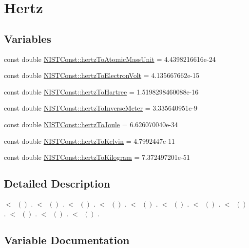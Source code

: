\hypertarget{group___hertz}{}\section{Hertz}
\label{group___hertz}
\subsection*{Variables}
\begin{DoxyCompactItemize}
\item 
const double \hyperlink{group___hertz_ga5e2fd7ea13ae13a34435ff0578082d34}{N\+I\+S\+T\+Const\+::hertz\+To\+Atomic\+Mass\+Unit} = 4.\+4398216616e-\/24
\item 
const double \hyperlink{group___hertz_ga035f43de5d8ad8208675c53a0057d14d}{N\+I\+S\+T\+Const\+::hertz\+To\+Electron\+Volt} = 4.\+135667662e-\/15
\item 
const double \hyperlink{group___hertz_ga2ededb8b750b44cde6d83c1c07b6a870}{N\+I\+S\+T\+Const\+::hertz\+To\+Hartree} = 1.\+5198298460088e-\/16
\item 
const double \hyperlink{group___hertz_ga6d5ccd7fed8ad7f2abb5c368565a1666}{N\+I\+S\+T\+Const\+::hertz\+To\+Inverse\+Meter} = 3.\+335640951e-\/9
\item 
const double \hyperlink{group___hertz_ga827c4e99287fcd5363fabcfe1381cc37}{N\+I\+S\+T\+Const\+::hertz\+To\+Joule} = 6.\+626070040e-\/34
\item 
const double \hyperlink{group___hertz_gacda137a5d10ebba59b340d770802678f}{N\+I\+S\+T\+Const\+::hertz\+To\+Kelvin} = 4.\+7992447e-\/11
\item 
const double \hyperlink{group___hertz_ga7b63758ab74cb80c236d4eacd5b89484}{N\+I\+S\+T\+Const\+::hertz\+To\+Kilogram} = 7.\+372497201e-\/51
\end{DoxyCompactItemize}


\subsection{Detailed Description}
$<$ $ \ ()$ . $<$ $ \ ()$ . $<$ $ \ ()$ . $<$ $ \ ()$ . $<$ $ \ ()$ . $<$ $ \ ()$ . $<$ $ \ ()$ . $<$ $ \ ()$ . $<$ $ \ ()$ . $<$ $ \ ()$ . $<$ $ \ ()$ . 

\subsection{Variable Documentation}
\mbox{\label{group___hertz_ga5e2fd7ea13ae13a34435ff0578082d34}} 

